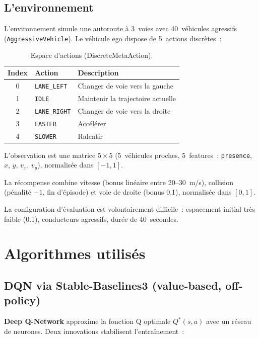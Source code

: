 \documentclass[11pt, a4paper]{article}
\begin{document}
\subsection{L'environnement}

L'environnement simule une autoroute à 3~voies avec 40~véhicules agressifs (\texttt{AggressiveVehicle}). Le véhicule ego dispose de 5~actions discrètes~:

\begin{table}[H]
\centering
\begin{tabular}{cll}
\toprule
\textbf{Index} & \textbf{Action} & \textbf{Description}\\
\midrule
0 & \texttt{LANE\_LEFT} & Changer de voie vers la gauche\\
1 & \texttt{IDLE} & Maintenir la trajectoire actuelle\\
2 & \texttt{LANE\_RIGHT} & Changer de voie vers la droite\\
3 & \texttt{FASTER} & Accélérer\\
4 & \texttt{SLOWER} & Ralentir\\
\bottomrule
\end{tabular}
\caption{Espace d'actions (DiscreteMetaAction).}
\end{table}

L'observation est une matrice $5\times 5$ (5~véhicules proches, 5~features~: \texttt{presence}, $x$, $y$, $v_x$, $v_y$), normalisée dans $[-1, 1]$.

La récompense combine vitesse (bonus linéaire entre 20--30~m/s), collision (pénalité $-1$, fin d'épisode) et voie de droite (bonus 0.1), normalisée dans $[0, 1]$.

La configuration d'évaluation est volontairement difficile~: espacement initial très faible (0.1), conducteurs agressifs, durée de 40~secondes.

\section{Algorithmes utilisés}

\subsection{DQN via Stable-Baselines3 (value-based, off-policy)}

\textbf{Deep Q-Network} \cite{mnih2015} approxime la fonction Q optimale $Q^*(s, a)$ avec un réseau de neurones. Deux innovations stabilisent l'entraînement~:
\end{document}
